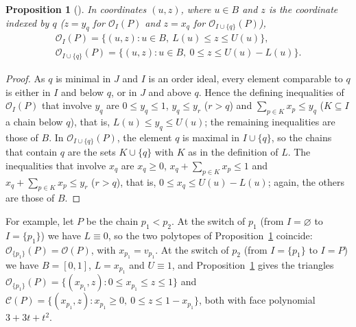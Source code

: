 \documentclass[11pt]{article}
\newtheorem{proposition}[theorem]{Proposition}
\theoremstyle{definition}
\theoremstyle{remark}
\newcommand{\OO}{\mathcal O}
\newcommand{\CC}{\mathcal C}
\begin{document}
\begin{proposition}[{\cite[Proposition~3.1]{Fourier}}]\label{prop:fibres}
In coordinates $(u,z)$, where $u\in B$ and $z$ is the coordinate indexed by $q$ ($z=y_q$
for $\OO_I(P)$ and $z=x_q$ for $\OO_{I\cup\{q\}}(P)$),
\begin{gather*}
\OO_I(P)=\{(u,z):u\in B,\ L(u)\leq z\leq U(u)\},\\
\OO_{I\cup\{q\}}(P)=\{(u,z):u\in B,\ 0\leq z\leq U(u)-L(u)\}.
\end{gather*}
\end{proposition}
\begin{proof}
As $q$ is minimal in $J$ and $I$ is an order ideal, every element comparable to $q$ is either in
$I$ and below $q$, or in $J$ and above $q$. Hence the defining inequalities of $\OO_I(P)$ that involve
$y_q$ are $0\leq y_q\leq1$, $y_q\leq y_r$ ($r>q$) and $\sum_{p\in K}x_p\leq y_q$ ($K\subseteq I$ a chain
below $q$), that is, $L(u)\leq y_q\leq U(u)$; the remaining inequalities are those of $B$. In
$\OO_{I\cup\{q\}}(P)$, the element $q$ is maximal in $I\cup\{q\}$, so the chains that contain $q$ are the
sets $K\cup\{q\}$ with $K$ as in the definition of $L$. The inequalities that involve $x_q$ are
$x_q\geq0$, $x_q+\sum_{p\in K}x_p\leq1$ and $x_q+\sum_{p\in K}x_p\leq y_r$ ($r>q$), that is,
$0\leq x_q\leq U(u)-L(u)$; again, the others are those of $B$.
\end{proof}
For example, let $P$ be the chain $p_1<p_2$. At the switch of $p_1$ (from $I=\varnothing$ to $I=\{p_1\}$) we
have $L\equiv0$, so the two polytopes of Proposition~\ref{prop:fibres} coincide: $\OO_{\{p_1\}}(P)=\OO(P)$, with
$x_{p_1}=v_{p_1}$. At the switch of $p_2$ (from $I=\{p_1\}$ to $I=P$) we have $B=[0,1]$, $L=x_{p_1}$ and
$U\equiv1$, and Proposition~\ref{prop:fibres} gives the triangles
$\OO_{\{p_1\}}(P)=\{(x_{p_1},z):0\leq x_{p_1}\leq z\leq1\}$ and
$\CC(P)=\{(x_{p_1},z):x_{p_1}\geq0,\ 0\leq z\leq1-x_{p_1}\}$, both with face polynomial $3+3t+t^2$.
\end{document}
